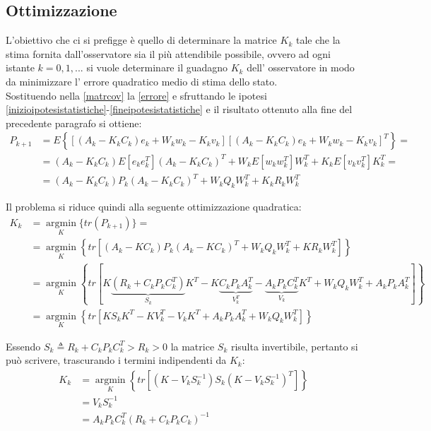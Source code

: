 \subsection{Ottimizzazione}
L'obiettivo che ci si prefigge è quello di determinare la matrice $K_k$ tale che la stima fornita dall'osservatore sia il più attendibile possibile, ovvero ad ogni istante $k=0,1,...$ si vuole determinare il guadagno $K_k$ dell' osservatore in modo da minimizzare l' errore quadratico medio di stima dello stato.\\
Sostituendo nella \eqref{matrcov} la \eqref{errore} e sfruttando le ipotesi \eqref{inizioipotesistatistiche}-\eqref{fineipotesistatistiche} e il risultato ottenuto alla fine del precedente paragrafo si ottiene: 
\begin{equation}
\begin{split}
P_{k+1} &= E\left\{[(A_k - K_k C_k) e_k + W_k w_k - K_k v_k][(A_k -K_k C_k)e_k+W_k w_k-K_k v_k]^T\right\}=\\
 &= (A_k-K_kC_k)E[e_ke^T_k](A_k-K_kC_k)^T +W_kE[w_kw^T_k]W^T_k + K_kE[v_kv^T_k]K^T_k=\\
&= (A_k-K_kC_k)P_k(A_k-K_kC_k)^T + W_kQ_kW^T_k+K_kR_kW^T_k
\end{split}
\end{equation}

\noindent Il problema si riduce quindi alla seguente ottimizzazione quadratica: 
\begin{equation}
\begin{split}
K_k &= \underset{K}{\operatorname{argmin}}\{tr(P_{k+1})\}=\\
&= \underset{K}{\operatorname{argmin}} \left\{ tr \left[(A_k-KC_k)P_k(A_k-KC_k)^T + W_kQ_kW^T_k+KR_kW^T_k\right] \right\} \\
&= \underset{K}{\operatorname{argmin}} \left\{ tr \left[ K\underbrace{(R_k+C_kP_kC_k^T)}_{S_k}K^T-K\underbrace{C_kP_kA_k^T}_{V^T_k}-\underbrace{A_kP_kC_k^T}_{V_k}K^T+W_kQ_kW_k^T+A_kP_kA_k^T \right]\right\} \\
&=  \underset{K}{\operatorname{argmin}} \left\{ tr \left[KS_kK^T-KV^T_k-V_kK^T+A_kP_kA_k^T+W_kQ_kW_k^T\right]\right\}
\end{split}
\end{equation}

\noindent Essendo $S_k \triangleq R_k+C_kP_kC_k^T > R_k > 0 $ la matrice $S_k$ risulta invertibile, pertanto si può scrivere, trascurando i termini indipendenti da $K_k$: 
\begin{equation}
\begin{split}
K_k &= \underset{K}{\operatorname{argmin}} \left\{tr\left[(K-V_kS^{-1}_k)S_k(K-V_kS^{-1}_k)^T\right]\right\}\\ 
&= V_kS^{-1}_k\\
&= A_kP_kC_k^T(R_k+C_kP_kC_k)^{-1}
\end{split}
\end{equation}

